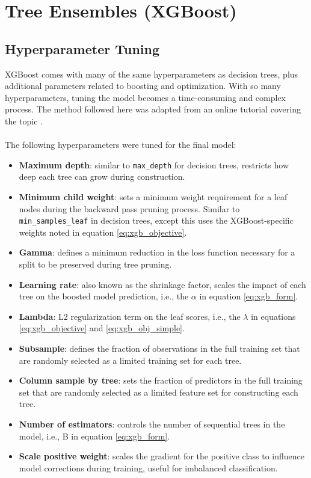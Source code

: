 \section{Tree Ensembles (XGBoost)}\label{ch5:xgb_model}
\subsection{Hyperparameter Tuning}\label{ch5:xgb_tuning}
XGBoost comes with many of the same hyperparameters as decision trees, plus additional parameters related to boosting and optimization. With so many hyperparameters, tuning the model becomes a time-consuming and complex process. The method followed here was adapted from an online tutorial covering the topic \citep{jain_xgboost_2016}.
\\
\\
The following hyperparameters were tuned for the final model:
\begin{itemize}[itemsep=2pt]
    \item \textbf{Maximum depth}: similar to \verb|max_depth| for decision trees, restricts how deep each tree can grow during construction.
    \item \textbf{Minimum child weight}: sets a minimum weight requirement for a leaf nodes during the backward pass pruning process. Similar to \verb|min_samples_leaf| in decision trees, except this uses the XGBoost-specific weights noted in equation \ref{eq:xgb_objective}.
    \item \textbf{Gamma}: defines a minimum reduction in the loss function necessary for a split to be preserved during tree pruning. 
    \item \textbf{Learning rate}: also known as the shrinkage factor, scales the impact of each tree on the boosted model prediction, i.e., the $\alpha$ in equation \ref{eq:xgb_form}.
    \item \textbf{Lambda}: L2 regularization term on the leaf scores, i.e., the $\lambda$ in equations \ref{eq:xgb_objective} and \ref{eq:xgb_obj_simple}.
    \item \textbf{Subsample}: defines the fraction of observations in the full training set that are randomly selected as a limited training set for each tree.
    \item \textbf{Column sample by tree}: sets the fraction of predictors in the full training set that are randomly selected as a limited feature set for constructing each tree.
    \item \textbf{Number of estimators}: controls the number of sequential trees in the model, i.e., B in equation \ref{eq:xgb_form}.
    \item \textbf{Scale positive weight}: scales the gradient for the positive class to influence model corrections during training, useful for imbalanced classification.
\end{itemize}

